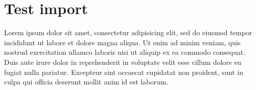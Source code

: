 \chapter{Test import}

Lorem ipsum dolor sit amet, consectetur adipisicing elit, sed do eiusmod
tempor incididunt ut labore et dolore magna aliqua. Ut enim ad minim veniam,
quis nostrud exercitation ullamco laboris nisi ut aliquip ex ea commodo
consequat. Duis aute irure dolor in reprehenderit in voluptate velit esse
cillum dolore eu fugiat nulla pariatur. Excepteur sint occaecat cupidatat non
proident, sunt in culpa qui officia deserunt mollit anim id est laborum.

